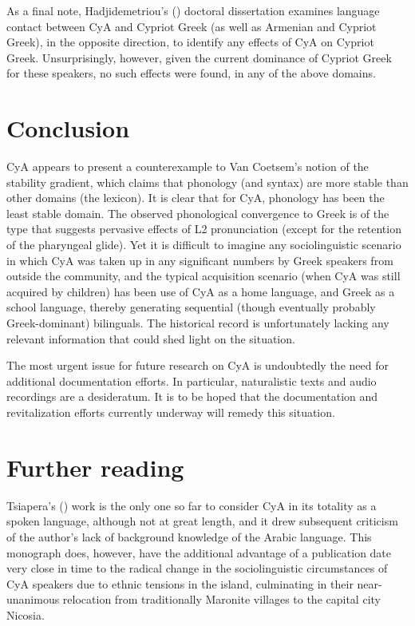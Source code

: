 \documentclass[output=paper]{langsci/langscibook}
\begin{document}
As a final note, Hadjidemetriou's (\citeyear{Hadjidemetriou2009}) doctoral dissertation examines language contact between CyA and Cypriot Greek (as well as Armenian and Cypriot Greek), in the opposite direction, to identify any effects of CyA on Cypriot Greek. Unsurprisingly, however, given the current dominance of Cypriot Greek for these speakers, no such effects were found, in any of the above domains. 

\section{Conclusion}

CyA appears to present a counterexample to Van Coetsem’s notion of the stability gradient, which claims that phonology (and syntax) are more stable than other domains (the lexicon). It is clear that for CyA, phonology has been the least stable domain. The observed phonological convergence to Greek is of the type that suggests pervasive effects of L2 pronunciation (except for the retention of the pharyngeal glide). Yet it is difficult to imagine any sociolinguistic scenario in which CyA was taken up in any significant numbers by Greek speakers from outside the community, and the typical acquisition scenario (when CyA was still acquired by children) has been use of CyA as a home language, and Greek as a school language, thereby generating sequential (though eventually probably Greek-dominant) bilinguals. The historical record is unfortunately lacking any relevant information that could shed light on the situation. 

The most urgent issue for future research on CyA is undoubtedly the need for additional documentation efforts. In particular, naturalistic texts and audio recordings are a desideratum. It is to be hoped that the documentation and revitalization efforts currently underway will remedy this situation. 

\section*{Further reading}

Tsiapera's (\citeyear{Tsiapera1969}) work is the only one so far to consider CyA in its totality as a spoken language, although not at great length, and it drew subsequent criticism of the author’s lack of background knowledge of the Arabic language. This monograph does, however, have the additional advantage of a publication date very close in time to the radical change in the sociolinguistic circumstances of CyA speakers due to ethnic tensions in the island, culminating in their near-unanimous relocation from traditionally Maronite villages to the capital city Nicosia. 
\end{document}
